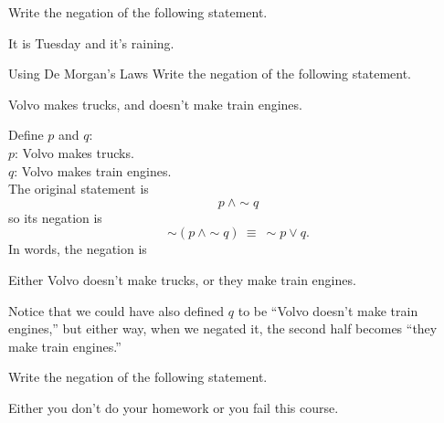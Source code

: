 \begin{try}
Write the negation of the following statement.
\begin{center}
It is Tuesday and it's raining.
\end{center}
\end{try}
\vfill
\pagebreak

\begin{example}[https://www.youtube.com/watch?v=182w7AGeUao]{Using De Morgan's Laws}
Write the negation of the following statement.
\begin{center}
Volvo makes trucks, and doesn't make train engines.
\end{center}

\sol
Define $p$ and $q$:\\
$p$: Volvo makes trucks.\\
$q$: Volvo makes train engines.\\

The original statement is \[p\ \wedge \sim q\] so its negation is 
\[\sim (p\ \wedge \sim q)\ \equiv\ \sim p \vee q.\]
In words, the negation is
\begin{center}
Either Volvo doesn't make trucks, or they make train engines.
\end{center}

Notice that we could have also defined $q$ to be ``Volvo doesn't make train engines,'' but either way, when we negated it, the second half becomes ``they make train engines.''
\end{example}

\begin{try}
Write the negation of the following statement.
\begin{center}
Either you don't do your homework or you fail this course.
\end{center}
\end{try}

